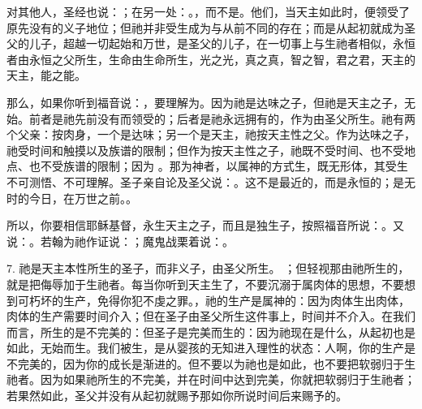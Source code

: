 对其他人，圣经也说：；在另一处：。，而不是。他们，当天主如此时，便领受了原先没有的义子地位；但祂并非受生成为与从前不同的存在；而是从起初就成为圣父的儿子，超越一切起始和万世，是圣父的儿子，在一切事上与生祂者相似，永恒者由永恒之父所生，生命由生命所生，光之光，真之真，智之智，君之君，天主的天主，能之能。\par

那么，如果你听到福音说：，要理解为。因为祂是达味之子，但祂是天主之子，无始。前者是祂先前没有而领受的；后者是祂永远拥有的，作为由圣父所生。祂有两个父亲：按肉身，一个是达味；另一个是天主，祂按天主性之父。作为达味之子，祂受时间和触摸以及族谱的限制；但作为按天主性之子，祂既不受时间、也不受地点、也不受族谱的限制；因为 。那为神者，以属神的方式生，既无形体，其受生不可测悟、不可理解。圣子亲自论及圣父说：。这不是最近的，而是永恒的；是无时的今日，在万世之前。。\par

所以，你要相信耶稣基督，永生天主之子，而且是独生子，按照福音所说：。又说：。若翰为祂作证说：；魔鬼战栗着说：。\par

7. 祂是天主本性所生的圣子，而非义子，由圣父所生。 ；但轻视那由祂所生的，就是把侮辱加于生祂者。每当你听到天主生了，不要沉溺于属肉体的思想，不要想到可朽坏的生产，免得你犯不虔之罪。，祂的生产是属神的：因为肉体生出肉体，肉体的生产需要时间介入；但在圣子由圣父所生这件事上，时间并不介入。在我们而言，所生的是不完美的：但圣子是完美而生的：因为祂现在是什么，从起初也是如此，无始而生。我们被生，是从婴孩的无知进入理性的状态：人啊，你的生产是不完美的，因为你的成长是渐进的。但不要以为祂也是如此，也不要把软弱归于生祂者。因为如果祂所生的不完美，并在时间中达到完美，你就把软弱归于生祂者；若果然如此，圣父并没有从起初就赐予那如你所说时间后来赐予的。\par

